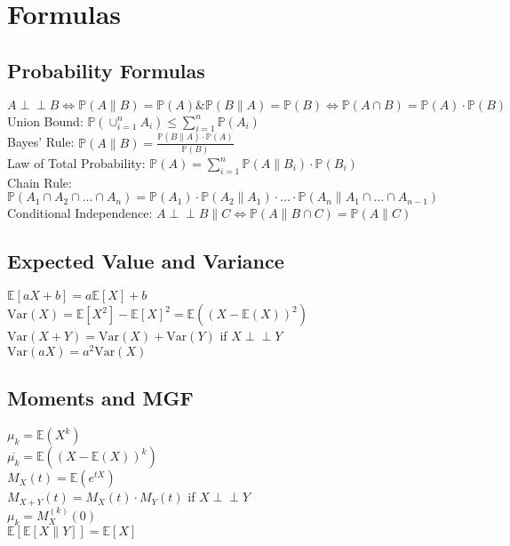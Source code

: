 \newcommand{\prob}{\ensuremath{\mathbb{P}}}
\newcommand{\ind}{\perp\!\!\!\!\perp} 
\newcommand{\expected}{\ensuremath{\mathbb{E}}}
\section{Formulas}
\subsection{Probability Formulas}
$A \ind B \Leftrightarrow \prob(A \| B) = \prob(A) \& \prob(B \| A) = \prob(B) \Leftrightarrow \prob(A \cap B) = \prob(A) \cdot \prob(B)$\\
Union Bound: $\prob(\cup_{i=1}^{n} A_i) \leq \sum_{i=1}^{n} \prob(A_i)$\\
Bayes' Rule: $\prob(A \| B) = \frac{\prob(B \| A) \cdot \prob(A)}{\prob(B)}$\\
Law of Total Probability: $\prob(A) = \sum_{i=1}^{n} \prob(A \| B_i) \cdot \prob(B_i)$\\
Chain Rule: $\prob(A_1 \cap A_2 \cap \ldots \cap A_n) = \prob(A_1) \cdot \prob(A_2 \| A_1) \cdot \ldots \cdot \prob(A_n \| A_1 \cap \ldots \cap A_{n-1})$\\
Conditional Independence: $A \ind B \| C \Leftrightarrow \prob(A \| B \cap C) = \prob(A \| C)$\\
\subsection{Expected Value and Variance}
$\mathbb{E}[aX + b] = a\mathbb{E}[X] + b$\\
$\text{Var}(X) = \mathbb{E}[X^2] - \mathbb{E}[X]^2 = \expected((X - \expected(X))^2)$\\
$\text{Var}(X + Y) = \text{Var}(X) + \text{Var}(Y)$ if $X \ind Y$\\
$\text{Var}(aX) = a^2 \text{Var}(X)$\\
\subsection{Moments and MGF}
$\mu_k = \expected(X^k)$\\
$\overline{\mu_k} = \expected((X - \expected(X))^k)$\\
$M_X(t) = \expected(e^{tX})$\\
$M_{X+Y}(t) = M_X(t) \cdot M_Y(t)$ if $X \ind Y$\\
$\mu_k = M_X^{(k)}(0)$\\
$\expected[\expected[X \| Y]] = \expected[X]$\\


